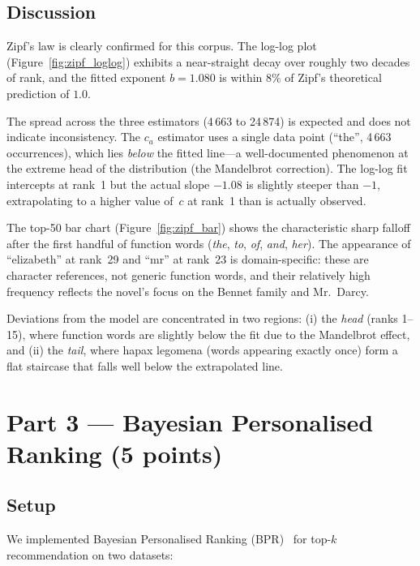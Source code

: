 \documentclass[12pt, a4paper]{article}
\begin{document}
\subsection{Discussion}

Zipf's law is clearly confirmed for this corpus.
The log-log plot (Figure~\ref{fig:zipf_loglog}) exhibits a near-straight
decay over roughly two decades of rank, and the fitted exponent
$b = 1.080$ is within $8\%$ of Zipf's theoretical prediction of $1.0$.

The spread across the three estimators (4\,663 to 24\,874) is expected
and does not indicate inconsistency.
The $c_a$ estimator uses a single data point (``the'', 4\,663 occurrences),
which lies \emph{below} the fitted line---a well-documented phenomenon
at the extreme head of the distribution (the Mandelbrot correction).
The log-log fit intercepts at rank~1 but the actual slope $-1.08$
is slightly steeper than $-1$, extrapolating to a higher value of~$c$
at rank~1 than is actually observed.

The top-50 bar chart (Figure~\ref{fig:zipf_bar}) shows the characteristic
sharp falloff after the first handful of function words
(\textit{the}, \textit{to}, \textit{of}, \textit{and}, \textit{her}).
The appearance of ``elizabeth'' at rank~29 and ``mr'' at rank~23 is
domain-specific: these are character references, not generic function
words, and their relatively high frequency reflects the novel's focus on
the Bennet family and Mr.\ Darcy.

Deviations from the model are concentrated in two regions:
(i) the \emph{head} (ranks 1--15), where function words are slightly
below the fit due to the Mandelbrot effect, and
(ii) the \emph{tail}, where hapax legomena (words appearing exactly once)
form a flat staircase that falls well below the extrapolated line.

\section{Part 3 — Bayesian Personalised Ranking (5 points)}

\subsection{Setup}

We implemented Bayesian Personalised Ranking (BPR)~\cite{rendle2009bpr}
for top-$k$ recommendation on two datasets:
\end{document}
